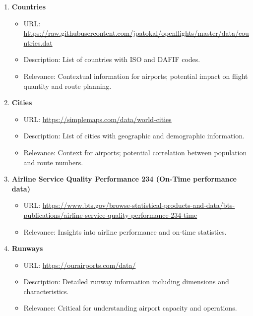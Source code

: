 \documentclass{article}
\begin{document}
\begin{enumerate}
    \item \textbf{Countries}
    \begin{itemize}
        \item URL: \href{https://raw.githubusercontent.com/jpatokal/openflights/master/data/countries.dat}{https://raw.githubusercontent.com/jpatokal/openflights/master/data/countries.dat}
        \item Description: List of countries with ISO and DAFIF codes.
        \item Relevance: Contextual information for airports; potential impact on flight quantity and route planning.
    \end{itemize}
    
    \item \textbf{Cities}
    \begin{itemize}
        \item URL: \href{https://simplemaps.com/data/world-cities}{https://simplemaps.com/data/world-cities}
        \item Description: List of cities with geographic and demographic information.
        \item Relevance: Context for airports; potential correlation between population and route numbers.
    \end{itemize}
    
    \item \textbf{Airline Service Quality Performance 234 (On-Time performance data)}
    \begin{itemize}
        \item URL: \href{https://www.bts.gov/browse-statistical-products-and-data/bts-publications/airline-service-quality-performance-234-time}{https://www.bts.gov/browse-statistical-products-and-data/bts-publications/airline-service-quality-performance-234-time}
        \item Relevance: Insights into airline performance and on-time statistics.
    \end{itemize}
    
    \item \textbf{Runways}
    \begin{itemize}
        \item URL: \href{https://ourairports.com/data/}{https://ourairports.com/data/}
        \item Description: Detailed runway information including dimensions and characteristics.
        \item Relevance: Critical for understanding airport capacity and operations.
    \end{itemize}
    

\end{enumerate}
\end{document}
